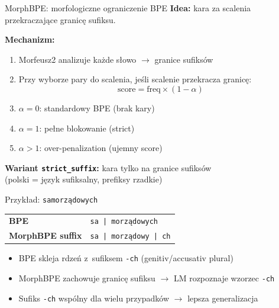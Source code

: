 \documentclass[aspectratio=169,11pt]{beamer}
\begin{document}
\begin{frame}{MorphBPE: morfologiczne ograniczenie BPE}
\textbf{Idea:} kara za scalenia przekraczające granicę sufiksu.

\bigskip

\textbf{Mechanizm:}
\begin{enumerate}
  \item Morfeusz2 analizuje każde słowo $\to$ granice sufiksów
  \item Przy wyborze pary do scalenia, jeśli scalenie przekracza granicę:
  \[
    \mathrm{score} = \mathrm{freq} \times (1 - \alpha)
  \]
  \item $\alpha = 0$: standardowy BPE (brak kary)
  \item $\alpha = 1$: pełne blokowanie (strict)
  \item $\alpha > 1$: over-penalization (ujemny score)
\end{enumerate}

\bigskip

\textbf{Wariant \texttt{strict\_suffix}:} kara tylko na granice sufiksów \\
(polski = język sufiksalny, prefiksy rzadkie)
\end{frame}

\begin{frame}{Przykład: \texttt{samorządowych}}
\begin{center}
\begin{tabular}{ll}
\toprule
\textbf{BPE} & \texttt{sa~|~morządowych} \\
\textbf{MorphBPE suffix} & \texttt{sa~|~morządowy~|~\textcolor{slayergreen}{ch}} \\
\bottomrule
\end{tabular}
\end{center}

\bigskip

\begin{itemize}
  \item BPE skleja rdzeń z~sufiksem \texttt{-ch} (genitiv/accusativ plural)
  \item MorphBPE zachowuje granicę sufiksu $\to$ LM rozpoznaje wzorzec \texttt{-ch}
  \item Sufiks \texttt{-ch} wspólny dla wielu przypadków $\to$ lepsza generalizacja
\end{itemize}
\end{frame}
\end{document}
